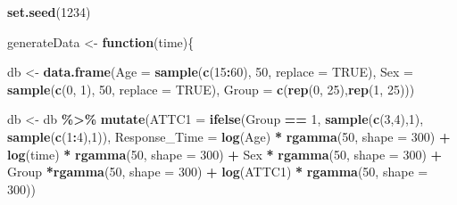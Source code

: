 \documentclass[
]{article}
\newenvironment{Shaded}{\begin{snugshade}}{\end{snugshade}}
\newcommand{\AttributeTok}[1]{\textcolor[rgb]{0.13,0.29,0.53}{#1}}
\newcommand{\ConstantTok}[1]{\textcolor[rgb]{0.56,0.35,0.01}{#1}}
\newcommand{\ControlFlowTok}[1]{\textcolor[rgb]{0.13,0.29,0.53}{\textbf{#1}}}
\newcommand{\DecValTok}[1]{\textcolor[rgb]{0.00,0.00,0.81}{#1}}
\newcommand{\FunctionTok}[1]{\textcolor[rgb]{0.13,0.29,0.53}{\textbf{#1}}}
\newcommand{\NormalTok}[1]{#1}
\newcommand{\OtherTok}[1]{\textcolor[rgb]{0.56,0.35,0.01}{#1}}
\newcommand{\SpecialCharTok}[1]{\textcolor[rgb]{0.81,0.36,0.00}{\textbf{#1}}}
\begin{document}
\begin{Shaded}
\begin{Highlighting}[]
\FunctionTok{set.seed}\NormalTok{(}\DecValTok{1234}\NormalTok{)}

\NormalTok{generateData }\OtherTok{\textless{}{-}} \ControlFlowTok{function}\NormalTok{(time)\{}
  
\NormalTok{  db }\OtherTok{\textless{}{-}} \FunctionTok{data.frame}\NormalTok{(}\AttributeTok{Age =} \FunctionTok{sample}\NormalTok{(}\FunctionTok{c}\NormalTok{(}\DecValTok{15}\SpecialCharTok{:}\DecValTok{60}\NormalTok{), }\DecValTok{50}\NormalTok{, }\AttributeTok{replace =} \ConstantTok{TRUE}\NormalTok{),}
                   \AttributeTok{Sex =} \FunctionTok{sample}\NormalTok{(}\FunctionTok{c}\NormalTok{(}\DecValTok{0}\NormalTok{, }\DecValTok{1}\NormalTok{), }\DecValTok{50}\NormalTok{, }\AttributeTok{replace =} \ConstantTok{TRUE}\NormalTok{),}
                   \AttributeTok{Group =} \FunctionTok{c}\NormalTok{(}\FunctionTok{rep}\NormalTok{(}\DecValTok{0}\NormalTok{, }\DecValTok{25}\NormalTok{),}\FunctionTok{rep}\NormalTok{(}\DecValTok{1}\NormalTok{, }\DecValTok{25}\NormalTok{)))}
  
\NormalTok{  db }\OtherTok{\textless{}{-}}\NormalTok{ db }\SpecialCharTok{\%\textgreater{}\%} \FunctionTok{mutate}\NormalTok{(}\AttributeTok{ATTC1 =} \FunctionTok{ifelse}\NormalTok{(Group }\SpecialCharTok{==} \DecValTok{1}\NormalTok{, }
                                     \FunctionTok{sample}\NormalTok{(}\FunctionTok{c}\NormalTok{(}\DecValTok{3}\NormalTok{,}\DecValTok{4}\NormalTok{),}\DecValTok{1}\NormalTok{), }
                                     \FunctionTok{sample}\NormalTok{(}\FunctionTok{c}\NormalTok{(}\DecValTok{1}\SpecialCharTok{:}\DecValTok{4}\NormalTok{),}\DecValTok{1}\NormalTok{)),}
                      \AttributeTok{Response\_Time =} \FunctionTok{log}\NormalTok{(Age) }\SpecialCharTok{*} \FunctionTok{rgamma}\NormalTok{(}\DecValTok{50}\NormalTok{, }\AttributeTok{shape =} \DecValTok{300}\NormalTok{) }\SpecialCharTok{+}
                        \FunctionTok{log}\NormalTok{(time) }\SpecialCharTok{*} \FunctionTok{rgamma}\NormalTok{(}\DecValTok{50}\NormalTok{, }\AttributeTok{shape =} \DecValTok{300}\NormalTok{) }\SpecialCharTok{+} 
\NormalTok{                        Sex }\SpecialCharTok{*} \FunctionTok{rgamma}\NormalTok{(}\DecValTok{50}\NormalTok{, }\AttributeTok{shape =} \DecValTok{300}\NormalTok{) }\SpecialCharTok{+} 
\NormalTok{                        Group }\SpecialCharTok{*}\FunctionTok{rgamma}\NormalTok{(}\DecValTok{50}\NormalTok{, }\AttributeTok{shape =} \DecValTok{300}\NormalTok{) }\SpecialCharTok{+} 
                        \FunctionTok{log}\NormalTok{(ATTC1) }\SpecialCharTok{*} \FunctionTok{rgamma}\NormalTok{(}\DecValTok{50}\NormalTok{, }\AttributeTok{shape =} \DecValTok{300}\NormalTok{))}
  

\end{Highlighting}
\end{Shaded}
\end{document}
